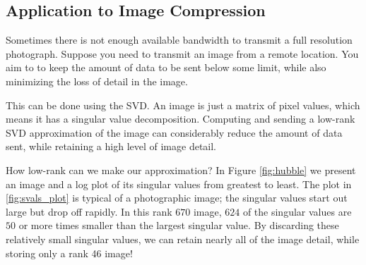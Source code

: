 \subsection*{Application to Image Compression}

Sometimes there is not enough available bandwidth to transmit a full resolution photograph.
Suppose you need to transmit an image from a remote location.
You aim to to keep the amount of data to be sent below some limit, while also minimizing the loss of detail in the image.

This can be done using the SVD.
An image is just a matrix of pixel values, which means it has a singular value decomposition.
Computing and sending a low-rank SVD approximation of the image can considerably reduce the amount of data sent, while retaining a high level of image detail.

How low-rank can we make our approximation?
In Figure \ref{fig:hubble} we present an image and a log plot of its singular values from greatest to least.
The plot in \ref{fig:svals_plot} is typical of a photographic image;
the singular values start out large but drop off rapidly.
In this rank $670$ image, $624$ of the singular values are $50$ or more times smaller than the largest singular value.
By discarding these relatively small singular values, we can retain nearly all of the image detail, while storing only a rank 46 image!

